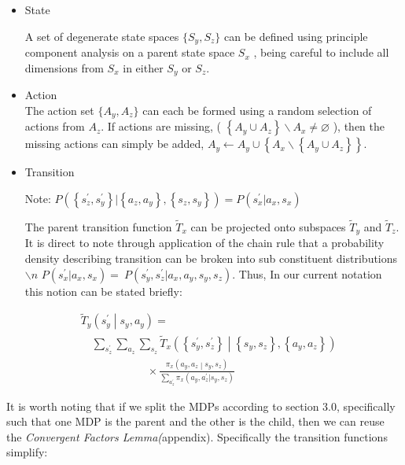 \documentclass[compsoc,journal,letterpaper,10pt,draftcls,twocolumn]{IEEEtran}
\begin{document}
\begin{itemize}
\item
  State

  A set of degenerate state spaces \(\{ S_{y}, S_{z}\}\) can be defined
  using principle component analysis on a parent state space \(S_{x}\) ,
  being careful to include all dimensions from \(S_{x}\) in either
  \(S_{y}\) or \(S_{z}\).
\item
  Action\\

  The action set \(\{ A_{y}, A_{z}\}\) can each be formed using a
  random selection of actions from \(A_{z}\). If actions are missing, (
  \(\left\{ A_{y} \cup A_{z} \right\}\backslash A_{x} \neq \varnothing \)
  ), then the missing actions can simply be added,
  \(A_{y} \leftarrow A_{y} \cup \left\{ A_{x}\backslash\left\{ A_{y} \cup A_{z} \right\} \right\}\).
\item
  Transition

  Note:
  \(P\left( \left\{ s_{z}^{\prime},s_{y}^{\prime} \right\}|\left\{ a_{z},a_{y} \right\},\left\{ s_{z},s_{y} \right\} \right) = P\left( s_{x}^{\prime}| a_{x}, s_{x} \right)\)

  The parent transition function \({\tilde{T}}_{x}\) can be projected
  onto subspaces \({\tilde{T}}_{y}\) and \({\tilde{T}}_{z}\). It is
  direct to note through application of the chain rule that a
  probability density describing transition can be broken into sub
  constituent distributions\(\backslash n\)
  \(P\left( s_{x}^{\prime}|a_{x},s_{x} \right) = \ P\left( s_{y}^{\prime},s_{z}^{\prime}|a_{x},a_{y},s_{y},s_{z} \right)\).
  Thus, In our current notation this notion can be stated briefly:
\end{itemize}

 
\begin{align}
& {\tilde{T}}_{y}\left( s_{y}^{\prime} \middle| s_{y}, a_{y} \right) = \nonumber \\
& \quad
\sum_{s_{z}^{\prime}}\sum_{a_{z}}\sum_{s_{z}}{\tilde{T}}_{x}\left( \left\{ s_{y}^{\prime},s_{z}^{\prime} \right\} \middle| \left\{ s_{y}^{\ },s_{z}^{\ } \right\},\left\{ a_{y},a_{z} \right\} \right) \nonumber \\
& \qquad\qquad\qquad \times
\frac{\pi_{x}\left( a_{y}, a_{z} \middle| s_{y} ,s_{z} \right)}{\displaystyle\sum_{a_{z}^{\prime}}\pi_{x}\left( a_{y},a_{z}^{\prime}|s_{y},s_{z} \right)}
\end{align}
 

It is worth noting that if we split the MDPs according to section 3.0,
specifically such that one MDP is the parent and the other is the child,
then we can reuse the \emph{Convergent Factors Lemma(}appendix).
Specifically the transition functions simplify:
\end{document}
